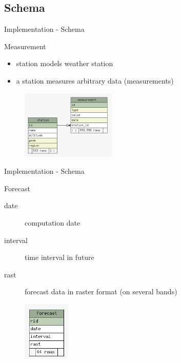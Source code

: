 \documentclass[ucs,9pt]{beamer}
\begin{document}
\subsection{Schema}
\begin{frame}{Implementation - Schema}
  \begin{block}{Measurement}
    \begin{itemize}
      \item station models weather station
      \item a station measures arbitrary data (measurements)
    \end{itemize}
  \end{block}

  \begin{figure}
    \centering
    \includegraphics[width=0.4\textwidth]{images/schema_station_measurement.png}
  \end{figure}
\end{frame}

\begin{frame}{Implementation - Schema}
  \begin{block}{Forecast}
    \begin{description}
      \item [date] computation date
      \item [interval] time interval in future
      \item [rast] forecast data in raster format (on several bands)
    \end{description}
  \end{block}

  \begin{figure}
    \centering
    \includegraphics[width=0.2\textwidth]{images/schema_forecast.png}
  \end{figure}
\end{frame}
\end{document}
